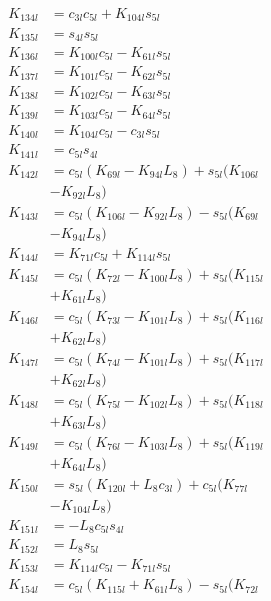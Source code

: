 \begin{multicols}{2}
\begin{align}
K_{134l} &= c_{3l}c_{5l} + K_{104l}s_{5l} \nonumber \\
K_{135l} &= s_{4l}s_{5l} \nonumber \\
K_{136l} &= K_{100l}c_{5l} - K_{61l}s_{5l} \nonumber \\
K_{137l} &= K_{101l}c_{5l} - K_{62l}s_{5l} \nonumber \\
K_{138l} &= K_{102l}c_{5l} - K_{63l}s_{5l} \nonumber \\
K_{139l} &= K_{103l}c_{5l} - K_{64l}s_{5l} \nonumber \\
K_{140l} &= K_{104l}c_{5l} - c_{3l}s_{5l} \nonumber \\
K_{141l} &= c_{5l}s_{4l} \nonumber \\
K_{142l} &= c_{5l}(K_{69l} - K_{94l}L_8) + s_{5l}(K_{106l}  \nonumber \\
&- K_{92l}L_8) \nonumber \\
K_{143l} &= c_{5l}(K_{106l} - K_{92l}L_8) - s_{5l}(K_{69l}  \nonumber \\
&- K_{94l}L_8) \nonumber \\
K_{144l} &= K_{71l}c_{5l} + K_{114l}s_{5l} \nonumber \\
K_{145l} &= c_{5l}(K_{72l} - K_{100l}L_8) + s_{5l}(K_{115l}  \nonumber \\
&+ K_{61l}L_8) \nonumber \\
K_{146l} &= c_{5l}(K_{73l} - K_{101l}L_8) + s_{5l}(K_{116l}  \nonumber \\
&+ K_{62l}L_8) \nonumber \\
K_{147l} &= c_{5l}(K_{74l} - K_{101l}L_8) + s_{5l}(K_{117l}  \nonumber \\
&+ K_{62l}L_8) \nonumber \\
K_{148l} &= c_{5l}(K_{75l} - K_{102l}L_8) + s_{5l}(K_{118l}  \nonumber \\
&+ K_{63l}L_8) \nonumber \\
K_{149l} &= c_{5l}(K_{76l} - K_{103l}L_8) + s_{5l}(K_{119l}  \nonumber \\
&+ K_{64l}L_8) \nonumber \\
K_{150l} &= s_{5l}(K_{120l} + L_8c_{3l}) + c_{5l}(K_{77l}  \nonumber \\
&- K_{104l}L_8) \nonumber \\
K_{151l} &= -L_8c_{5l}s_{4l} \nonumber \\
K_{152l} &= L_8s_{5l} \nonumber \\
K_{153l} &= K_{114l}c_{5l} - K_{71l}s_{5l} \nonumber \\
K_{154l} &= c_{5l}(K_{115l} + K_{61l}L_8) - s_{5l}(K_{72l}  \nonumber \\

\end{align}
\end{multicols}
